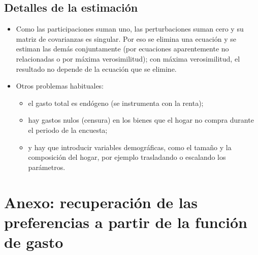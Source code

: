 \documentclass[11pt]{article}
\begin{document}
\subsection{Detalles de la estimación}\label{anexo:econometria}

\begin{itemize}
\item Como las participaciones suman uno, las perturbaciones suman cero y su matriz de covarianzas es singular. Por eso se elimina una ecuación y se estiman las demás conjuntamente (por ecuaciones aparentemente no relacionadas o por máxima verosimilitud); con máxima verosimilitud, el resultado no depende de la ecuación que se elimine\nocite{Barten1969Maximum}.
\item Otros problemas habituales:
  \begin{itemize}
  \item el gasto total es endógeno (se instrumenta con la renta);
  \item hay gastos nulos (censura) en los bienes que el hogar no compra durante el periodo de la encuesta;
  \item y hay que introducir variables demográficas, como el tamaño y la composición del hogar, por ejemplo trasladando o escalando los parámetros\nocite{PollakWales1981Demographic}.
  \end{itemize}
\end{itemize}

\section{Anexo: recuperación de las preferencias\cortetitulo{} a partir de la función de gasto}\label{anexo:integrabilidad}
\end{document}
